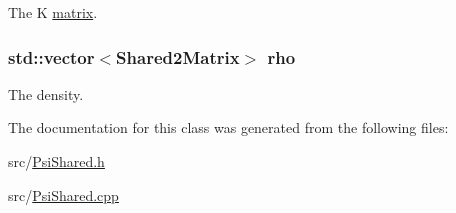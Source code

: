 The K \hyperlink{classJKBuilder_1_1matrix}{matrix}. \hypertarget{classJKBuilder_1_1SharedFactory_af21e4022fc5e357635e5b22bb359fcba}{
\subsubsection[{rho}]{\setlength{\rightskip}{0pt plus 5cm}std::vector$<${\bf Shared2Matrix}$>$ {\bf rho}}}
\label{classJKBuilder_1_1SharedFactory_af21e4022fc5e357635e5b22bb359fcba}


The density. 

The documentation for this class was generated from the following files:\begin{DoxyCompactItemize}
\item 
src/\hyperlink{PsiShared_8h}{PsiShared.h}\item 
src/\hyperlink{PsiShared_8cpp}{PsiShared.cpp}\end{DoxyCompactItemize}
